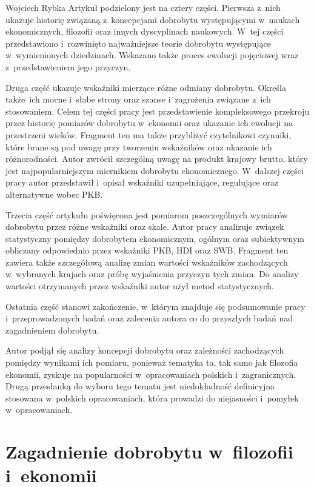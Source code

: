 \begin{artplenv}{Wojciech Rybka}
Artykuł podzielony jest na cztery części. Pierwsza z~nich ukazuje historię związaną z~koncepcjami dobrobytu występującymi
w~naukach ekonomicznych, filozofii oraz innych dyscyplinach naukowych. W~tej części przedstawiono i~rozwinięto
najważniejsze teorie dobrobytu występujące w~wymienionych dziedzinach. Wskazano także proces ewolucji pojęciowej
wraz z~przedstawieniem jego przyczyn.

Druga część ukazuje wskaźniki mierzące różne odmiany dobrobytu. Określa także~ich mocne i~słabe strony oraz
szanse i~zagrożenia związane z~ich stosowaniem. Celem tej części pracy jest przedstawienie kompleksowego przekroju przez
historię pomiarów dobrobytu w~ekonomii oraz ukazanie ich ewolucji na przestrzeni wieków. Fragment ten ma także
przybliżyć czytelnikowi czynniki, które brane są pod uwagę przy tworzeniu wskaźników oraz ukazanie ich różnorodności.
Autor zwrócił szczególną uwagę na produkt krajowy brutto, który jest najpopularniejszym miernikiem dobrobytu
ekonomicznego. W~dalszej części pracy autor przedstawił i~opisał wskaźniki uzupełniające, regulujące oraz alternatywne
wobec PKB.

Trzecia część artykułu poświęcona jest pomiarom poszczególnych wymiarów dobrobytu przez różne wskaźniki oraz skale.
Autor pracy analizuje związek statystyczny pomiędzy dobrobytem ekonomicznym, ogólnym oraz subiektywnym obliczany
odpowiednio przez wskaźniki PKB, HDI oraz SWB. Fragment ten zawiera także szczegółową analizę zmian wartości wskaźników
zachodzących w~wybranych krajach oraz próbę wyjaśnienia przyczyn tych zmian. Do analizy wartości otrzymanych przez
wskaźniki autor użył metod statystycznych.

Ostatnia część stanowi zakończenie, w~którym znajduje się podsumowanie pracy  i~przeprowadzonych badań oraz zalecenia
autora co do przyszłych badań nad zagadnieniem dobrobytu.

Autor podjął się analizy koncepcji dobrobytu oraz zależności zachodzących pomiędzy wynikami ich pomiaru, ponieważ
tematyka ta, tak samo jak filozofia ekonomii, zyskuje na popularności w~opracowaniach polskich i~zagranicznych. Drugą
przesłanką do wyboru tego tematu jest niedokładność definicyjna stosowana w~polskich opracowaniach, która prowadzi do
niejasności i~pomyłek w~opracowaniach.

\section{Zagadnienie dobrobytu w~filozofii i~ekonomii}
\baselineskip

\end{artplenv}
